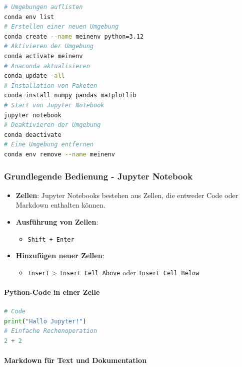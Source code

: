 \documentclass{vorlage-design-main}
\begin{document}
\begin{lstlisting}[language=bash]
# Umgebungen auflisten
conda env list
# Erstellen einer neuen Umgebung
conda create --name meinenv python=3.12
# Aktivieren der Umgebung
conda activate meinenv
# Anaconda aktualisieren
conda update -all
# Installation von Paketen
conda install numpy pandas matplotlib
# Start von Jupyter Notebook
jupyter notebook
# Deaktivieren der Umgebung
conda deactivate
# Eine Umgebung entfernen
conda env remove --name meinenv
\end{lstlisting}

\subsubsection{Grundlegende Bedienung - Jupyter
Notebook}\label{grundlegende-bedienung---jupyter-notebook}

\begin{itemize}

\item
  \textbf{Zellen}: Jupyter Notebooks bestehen aus Zellen, die entweder
  Code oder Markdown enthalten können.
\item
  \textbf{Ausführung von Zellen}:

  \begin{itemize}
  
  \item
    \verb|Shift + Enter|
  \end{itemize}
\item
  \textbf{Hinzufügen neuer Zellen}:

  \begin{itemize}
  
  \item
    \verb|Insert| \textgreater{}
    \verb|Insert Cell Above| oder
    \verb|Insert Cell Below|
  \end{itemize}
\end{itemize}

\paragraph{Python-Code in einer Zelle}\label{python-code-in-einer-zelle}

\begin{lstlisting}[language=Python]
# Code
print("Hallo Jupyter!")
# Einfache Rechenoperation
2 + 2
\end{lstlisting}

\paragraph{Markdown für Text und
Dokumentation}\label{markdown-fuer-text-und-dokumentation}
\end{document}
